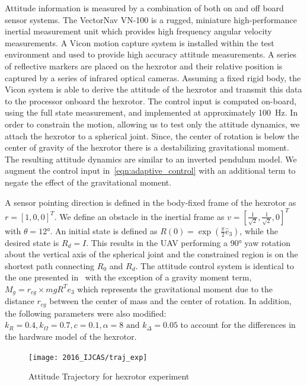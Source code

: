 Attitude information is measured by a combination of both on and off board sensor systems.
The VectorNav VN-100 is a rugged, miniature high-performance inertial measurement unit which provides high frequency angular velocity measurements.
A Vicon motion capture system is installed within the test environment and used to provide high accuracy attitude measurements. 
A series of reflective markers are placed on the hexrotor and their relative position is captured by a series of infrared optical cameras. 
Assuming a fixed rigid body, the Vicon system is able to derive the attitude of the hexrotor and transmit this data to the processor onboard the hexrotor.
The control input is computed on-board, using the full state measurement, and implemented at approximately \SI{100}{\hertz}.
In order to constrain the motion, allowing us to test only the attitude dynamics, we attach the hexrotor to a spherical joint.
Since, the center of rotation is below the center of gravity of the hexrotor there is a destabilizing gravitational moment.
The resulting attitude dynamics are similar to an inverted pendulum model.
We augment the control input in~\cref{eqn:adaptive_control} with an additional term to negate the effect of the gravitational moment.

A sensor pointing direction is defined in the body-fixed frame of the hexrotor as \( r = [1,0,0]^T \).
We define an obstacle in the inertial frame as \( v = [\frac{1}{\sqrt{2}}, \frac{1}{\sqrt{2}}, 0]^T \) with \( \theta = \ang{12} \).
An initial state is defined as \(R(0) = \exp( \frac{\pi}{2} \hat{e}_3) \), while the desired state is \(R_d =I \).
This results in the UAV performing a \ang{90} yaw rotation about the vertical axis of the spherical joint and the constrained region is on the shortest path connecting $R_0$ and $R_d$. 
The attitude control system is identical to the one presented in~ with the exception of a gravity moment term, \( M_g = r_{cg} \times m g R^T e_3\) which represents the gravitational moment due to the distance \( r_{cg} \) between the center of mass and the center of rotation. 
In addition, the following parameters were also modified: \(k_R = 0.4, k_\Omega = 0.7 ,c = 0.1 , \alpha = 8 \text{ and } k_\Delta = 0.05\) to account for the differences in the hardware model of the hexrotor.
\begin{figure}[t]
    \centering 
    \texttt{[image: 2016\_IJCAS/traj\_exp]}
    \caption{ Attitude Trajectory for hexrotor experiment \label{fig:traj_exp} }
    \label{fig:exp} 
\end{figure}

